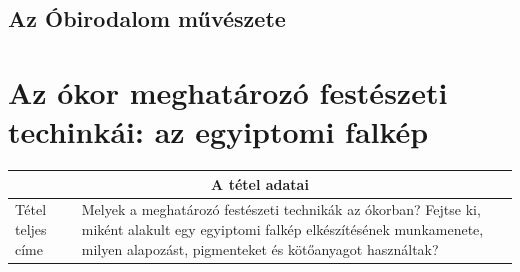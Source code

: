 \hfill

\subsection*{Az Óbirodalom művészete}

\cleardoublepage

\section{Az ókor meghatározó festészeti techinkái: az egyiptomi falkép}

\begin{center}
	\begin{longtable}{ | m{} | p{} | }
		
		\hline
		\multicolumn{2}{|c|}{\textbf{A tétel adatai}}
		\\ \hline
		
		\hline
		Tétel teljes címe	
		 &
		 Melyek a meghatározó festészeti technikák az ókorban? Fejtse ki, miként alakult egy egyiptomi falkép elkészítésének munkamenete, milyen alapozást, pigmenteket és kötőanyagot használtak?
		\\ \hline
		
	\end{longtable}
\end{center}